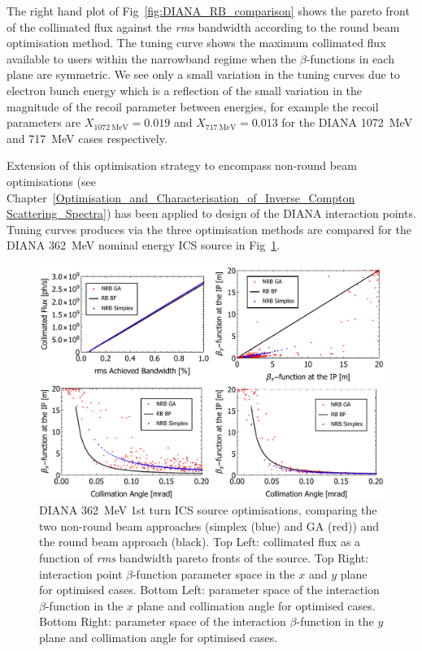 \documentclass[../main.tex]{subfiles}
\begin{document}
The right hand plot of Fig~\ref{fig:DIANA_RB_comparison} shows the pareto front of the collimated flux against the \textit{rms} bandwidth according to the round beam optimisation method. The tuning curve shows the maximum collimated flux available to users within the narrowband regime when the $\beta$-functions in each plane are symmetric. We see only a small variation in the tuning curves due to electron bunch energy which is a reflection of the small variation in the magnitude of the recoil parameter between energies, for example the recoil parameters are $X_{1072~\mathrm{\si{\mega\electronvolt}}} = 0.019$ and $X_{717~\mathrm{\si{\mega\electronvolt}}} = 0.013$ for the DIANA 1072~\si{\mega\electronvolt} and 717~\si{\mega\electronvolt} cases respectively. 

Extension of this optimisation strategy to encompass non-round beam optimisations (see Chapter~\ref{Optimisation_and_Characterisation_of_Inverse_Compton Scattering_Spectra}) has been applied to design of the DIANA interaction points. Tuning curves produces via the three optimisation methods are compared for the DIANA 362~\si{\mega\electronvolt} nominal energy ICS source in Fig~\ref{fig:DIANA362_comparison_optimisation}.

\begin{figure}[!h]
\centering
\includegraphics[width=\textwidth]{Figures/DIANA_Inverse_Compton_Source_Design/DIANA_Tuning_Curve_Opt/DIANA362fullcomp.pdf}
\caption{DIANA 362~\si{\mega\electronvolt} 1st turn ICS source optimisations, comparing the two non-round beam approaches (simplex (blue) and GA (red)) and the round beam approach (black). Top Left: collimated flux as a function of \textit{rms} bandwidth pareto fronts of the source. Top Right: interaction point $\beta$-function parameter space in the $x$ and $y$ plane for optimised cases. Bottom Left: parameter space of the interaction $\beta$-function in the $x$ plane and collimation angle for optimised cases. Bottom Right: parameter space of the interaction $\beta$-function in the $y$ plane and collimation angle for optimised cases.}
\label{fig:DIANA362_comparison_optimisation}
\end{figure}
\end{document}
